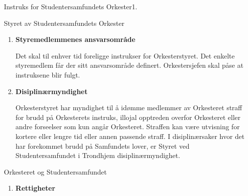 \begin{instruks}{Instruks for Studentersamfundets Orkester}{1. }{ }
\begin{instruksledd}{Styret av Studentersamfundets Orkester}
\begin{enumerate}
                Orkesterstyret skal representere Orkesteret og sørge for at Orkesterets rettigheter og plikter blir
                ivaretatt.

                Orkesterstyret skal se til at de enkelte gruppene drives på en sunn måte. Dette innebærer oppfølging
                av blant
                annet de enkelte gruppenes semesterplaner og økonomi.

                Orkestersjefen, eller den Orkestersjefen bemyndiger, skal innkalle til styremøte når det er
                nødvendig,
                minimum en gang per uke. Det skal også avholdes styremøte dersom minimum tre styremedlemmer krever
                det og kaller inn resten av styret på ordinær måte. I månedene juni, juli, august og desember holdes
                det
                normalt ikke styremøter.

                Ved grov pliktforsømmelse kan styremedlemmer avsettes ved ekstraordinær generalforsamling.

            \item \textbf{Styremedlemmenes ansvarsområde}

                Det skal til enhver tid foreligge instrukser for Orkesterstyret. Det enkelte styremedlem får der
                sitt
                ansvarsområde definert. Orkestersjefen skal påse at instruksene blir fulgt.

            \item \textbf{Disiplinærmyndighet}

                Orkesterstyret har myndighet til å idømme medlemmer av Orkesteret straff for brudd på Orkesterets
                instruks,
                illojal opptreden overfor Orkesteret eller andre forseelser som kun angår Orkesteret. Straffen kan
                være
                utvisning for kortere eller lengre tid eller annen passende straff. I disiplinærsaker hvor det har
                forekommet
                brudd på Samfundets lover, er Styret ved Studentersamfundet i Trondhjem disiplinærmyndighet.

        \end{enumerate}
    \end{instruksledd}

    \begin{instruksledd}{Orkesteret og Studentersamfundet}
        \begin{enumerate}
            \item \textbf{Rettigheter}


\end{enumerate}
\end{instruksledd}
\end{instruks}
